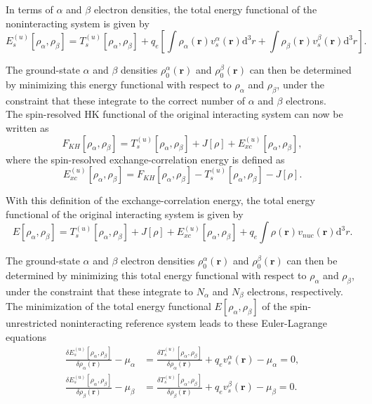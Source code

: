 \documentclass[%
 preprint, linenumbers,
 amsmath,amssymb,
 aps, physrev,
]{revtex4-2}
\begin{document}
In terms of $\alpha$ and $\beta$ electron densities, the total energy functional of the noninteracting system is given by
\begin{equation}
    E_s^{(u)}[\rho_{\alpha},\rho_{\beta}] = T_s^{(u)}[\rho_{\alpha},\rho_{\beta}] + q_e\left[ \int\rho_{\alpha}(\mathbf{r})v_s^{\alpha}(\mathbf{r})\mathrm{d}^3r + \int\rho_{\beta}(\mathbf{r})v_s^{\beta}(\mathbf{r})\mathrm{d}^3r \right].
\end{equation}

The ground-state $\alpha$ and $\beta$ densities $\rho_0^{\alpha}(\mathbf{r})$ and $\rho_0^{\beta}(\mathbf{r})$ can then be determined by minimizing this energy functional with respect to $\rho_{\alpha}$ and $\rho_{\beta}$, under the constraint that these integrate to the correct number of $\alpha$ and $\beta$ electrons.\\

The spin-resolved HK functional of the original interacting system can now be written as
\begin{equation}
    F_{KH}[\rho_{\alpha},\rho_{\beta}] = T_s^{(u)}[\rho_{\alpha},\rho_{\beta}] + J[\rho] + E_{xc}^{(u)}[\rho_{\alpha},\rho_{\beta}],
\end{equation}
where the spin-resolved exchange-correlation energy is defined as
\begin{equation}
    E_{xc}^{(u)}[\rho_{\alpha},\rho_{\beta}] = F_{KH}[\rho_{\alpha},\rho_{\beta}] - T_s^{(u)}[\rho_{\alpha},\rho_{\beta}] - J[\rho].
\end{equation}

With this definition of the exchange-correlation energy, the total energy functional of the original interacting system is given by
\begin{equation}
    E[\rho_{\alpha},\rho_{\beta}] = T_s^{(u)}[\rho_{\alpha},\rho_{\beta}] + J[\rho] + E_{xc}^{(u)}[\rho_{\alpha},\rho_{\beta}] + q_e\int\rho(\mathbf{r})v_{nuc}(\mathbf{r})\mathrm{d}^3r.
\end{equation}

The ground-state $\alpha$ and $\beta$ electron densities $\rho_0^{\alpha}(\mathbf{r})$ and $\rho_0^{\beta}(\mathbf{r})$ can then be determined by minimizing this total energy functional with respect to $\rho_{\alpha}$ and $\rho_{\beta}$, under the constraint that these integrate to $N_{\alpha}$ and $N_{\beta}$ electrons, respectively.\\

The minimization of the total energy functional $E[\rho_{\alpha},\rho_{\beta}]$ of the spin-unrestricted noninteracting reference system leads to these Euler-Lagrange equations
\begin{align}
    \frac{\delta E_s^{(u)}[\rho_{\alpha},\rho_{\beta}]}{\delta\rho_{\alpha}(\mathbf{r})} - \mu_{\alpha} &= \frac{\delta T_s^{(u)}[\rho_{\alpha},\rho_{\beta}]}{\delta\rho_{\alpha}(\mathbf{r})} + q_ev_s^{\alpha}(\mathbf{r}) - \mu_{\alpha} = 0, \\
    \frac{\delta E_s^{(u)}[\rho_{\alpha},\rho_{\beta}]}{\delta\rho_{\beta}(\mathbf{r})} - \mu_{\beta} &= \frac{\delta T_s^{(u)}[\rho_{\alpha},\rho_{\beta}]}{\delta\rho_{\beta}(\mathbf{r})} + q_ev_s^{\beta}(\mathbf{r}) - \mu_{\beta} = 0.
\end{align}
\end{document}
